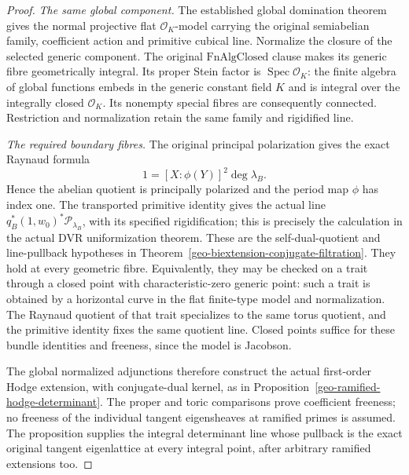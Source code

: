 \begin{proof}
\emph{The same global component.}
The established global domination theorem\cite{current-construction-record} gives the normal projective
flat $\mathcal O_K$-model carrying the original semiabelian family,
coefficient action and primitive cubical line.  Normalize the closure
of the selected generic component.  The original
$\mathrm{FnAlgClosed}$ clause makes its generic fibre geometrically
integral.  Its proper Stein factor is $\operatorname{Spec}\mathcal O_K$:
the finite algebra of global functions embeds in the generic
constant field $K$ and is integral over the integrally closed
$\mathcal O_K$.  Its nonempty special fibres are consequently
connected.  Restriction and normalization retain the same family and
rigidified line.

\emph{The required boundary fibres.}
The original principal polarization gives the exact Raynaud formula
\[
       1=[X:\phi(Y)]^2\deg\lambda_B.
\]
Hence the abelian quotient is principally polarized and the period
map $\phi$ has index one.  The transported primitive identity gives
the actual line $q_B^*(1,w_0)^*\mathcal P_{\lambda_B}$, with its
specified rigidification; this is precisely the calculation in
the actual DVR uniformization theorem\cite{current-construction-record}.  These are the
self-dual-quotient and line-pullback hypotheses in
Theorem~\ref{geo-biextension-conjugate-filtration}.
They hold at every geometric fibre.  Equivalently, they may be
checked on a trait through a closed point with characteristic-zero
generic point: such a trait is obtained by a horizontal curve in the
flat finite-type model and normalization.  The Raynaud quotient of
that trait specializes to the same torus quotient, and the primitive
identity fixes the same quotient line.  Closed points suffice for
these bundle identities and freeness, since the model is Jacobson.

The global normalized adjunctions therefore construct the actual
first-order Hodge extension, with conjugate-dual kernel, as in
Proposition~\ref{geo-ramified-hodge-determinant}.  The proper and
toric comparisons prove coefficient freeness; no freeness of the
individual tangent eigensheaves at ramified primes is assumed.
The proposition supplies the integral determinant line whose
pullback is the exact original tangent eigenlattice at every
integral point, after arbitrary ramified extensions too.


\end{proof}
